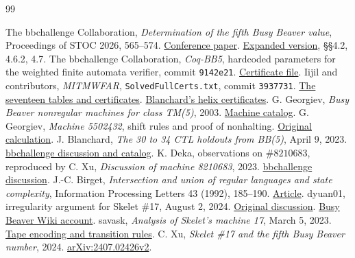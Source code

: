 \documentclass[11pt]{article}
\newcommand{\word}[1]{\texttt{#1}}
\begin{document}
\begin{thebibliography}{99}\small\raggedright
\setlength{\itemsep}{1pt}\setlength{\parskip}{0pt}
 The bbchallenge Collaboration, \emph{Determination of the fifth Busy Beaver value}, Proceedings of STOC 2026, 565--574. \href{https://doi.org/10.1145/3798129.3806376}{Conference paper}. \href{https://arxiv.org/abs/2509.12337v2}{Expanded version}, \S\S4.2, 4.6.2, 4.7.
 The bbchallenge Collaboration, \emph{Coq-BB5}, hardcoded parameters for the weighted finite automata verifier, commit \word{9142e21}. \href{https://github.com/ccz181078/Coq-BB5/blob/9142e219229baf2245d3f70851947230ea28a318/CoqBB5/BB5/BB5_Deciders_Hardcoded_Parameters/Verifier_WFAR_Hardcoded_Certificates.v}{Certificate file}.
 Iijil and contributors, \emph{MITMWFAR}, \word{SolvedFullCerts.txt}, commit \word{3937731}. \href{https://github.com/Iijil1/MITMWFAR/blob/3937731f9e1d801d6f6d77cf44787f93fc1ffc76/SolvedFullCerts.txt}{The seventeen tables and certificates}. \href{https://github.com/Iijil1/MITMWFAR/pull/1}{Blanchard's helix certificates}.
 G. Georgiev, \emph{Busy Beaver nonregular machines for class TM(5)}, 2003. \href{https://skelet.ludost.net/bb/nreg.html}{Machine catalog}.
 G. Georgiev, \emph{Machine 5502432}, shift rules and proof of nonhalting. \href{https://skelet.ludost.net/bb/proof_5502432.txt}{Original calculation}.
 J. Blanchard, \emph{The 30 to 34 CTL holdouts from BB(5)}, April 9, 2023. \href{https://discuss.bbchallenge.org/t/the-30-to-34-ctl-holdouts-from-bb-5/141/1}{bbchallenge discussion and catalog}.
 K. Deka, observations on \(\#8210683\), reproduced by C. Xu, \emph{Discussion of machine 8210683}, 2023. \href{https://discuss.bbchallenge.org/t/8210683-does-hot-halt/163/1}{bbchallenge discussion}.
 J.-C. Birget, \emph{Intersection and union of regular languages and state complexity}, Information Processing Letters 43 (1992), 185--190. \href{https://doi.org/10.1016/0020-0190(92)90198-5}{Article}.
 dyuan01, irregularity argument for Skelet \#17, August 2, 2024. \href{https://discord.com/channels/960643023006490684/1082035052961091705/1269022847502647357}{Original discussion}. \href{https://wiki.bbchallenge.org/wiki/Skelet_17#Irregularity}{Busy Beaver Wiki account}.
 savask, \emph{Analysis of Skelet's machine 17}, March 5, 2023. \href{https://docs.bbchallenge.org/other/skelet17_savasks_analysis.pdf}{Tape encoding and transition rules}.
 C. Xu, \emph{Skelet \#17 and the fifth Busy Beaver number}, 2024. \href{https://arxiv.org/abs/2407.02426v2}{arXiv:2407.02426v2}.

\end{thebibliography}
\end{document}
